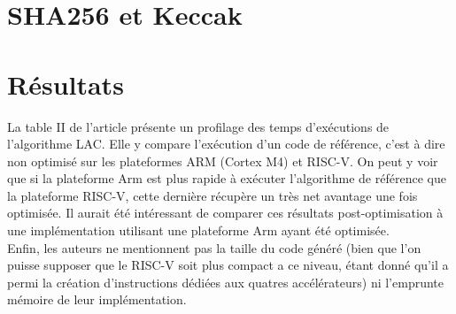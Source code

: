\documentclass[10pt,a4paper]{article}
\begin{document}
\section{SHA256 et Keccak}




\section{Résultats}
La table II de l'article présente un profilage des temps d'exécutions de l'algorithme LAC. Elle y compare l'exécution d'un code de référence, c'est à dire non optimisé sur les plateformes
 ARM (Cortex M4) et RISC-V. On peut y voir que si la plateforme Arm est plus rapide à exécuter l'algorithme de référence que la plateforme RISC-V, cette dernière récupère un très net avantage 
une fois optimisée. Il aurait été intéressant de comparer ces résultats post-optimisation à une implémentation utilisant une plateforme Arm ayant été optimisée.\\
Enfin, les auteurs ne mentionnent pas la taille du code généré (bien que l'on puisse supposer que le RISC-V soit plus compact a ce niveau, étant donné qu'il a permi la création d'instructions 
dédiées aux quatres accélérateurs) ni l'emprunte mémoire de leur implémentation.
\end{document}
